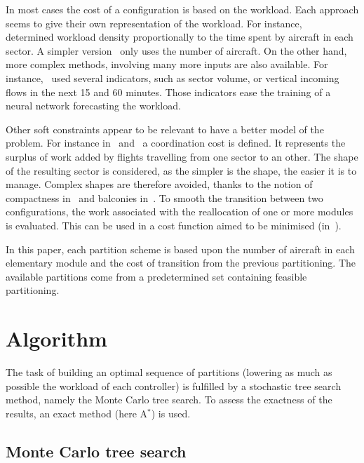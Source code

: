 \documentclass[oneside,twocolumn]{article}
\begin{document}
In most cases the cost of a configuration is based on the workload. Each
approach seems to give their own representation of the workload. For instance,
~\cite{bedouet2016towards} determined workload density proportionally to the time
spent by aircraft in each sector. A simpler version~\cite{sergeeva2017dynamic}
only uses the number of aircraft. On the other hand, more complex methods,
involving many more inputs are also available. For
instance,~\cite{gianazza2010forecasting} used several indicators, such as sector
volume, or vertical incoming flows in the next 15 and 60 minutes. Those
indicators ease the training of a neural network forecasting the workload.

Other soft constraints appear to be relevant to have a better model of
the problem. For instance in~\cite{sergeeva2017dynamic}
and~\cite{bedouet2016towards} a
coordination cost is defined. It represents the surplus of work added by
flights travelling from one sector to an other. The shape of the
resulting sector is considered, as the simpler is
the shape, the easier it is to manage. Complex shapes are therefore avoided,
thanks to the notion of compactness in~\cite{jagare2013airspace} and balconies
in~\cite{sergeeva2017dynamic}. To smooth the transition between two
configurations, the work associated with the reallocation of one or more modules
is evaluated. This can be used in a cost function aimed to be minimised
(in~\cite{bedouet2016towards}).

In this paper, each partition scheme is based upon the number of aircraft in
each
elementary module and the cost of transition from the previous partitioning. The
available partitions come from a predetermined set containing feasible
partitioning.

\section{Algorithm}

The task of building an optimal sequence of partitions (lowering
as much as possible the workload of each controller) is fulfilled by a
stochastic tree search method, namely the Monte Carlo tree search. To assess the
exactness of the results, an exact method (here A\(^*\)) is used.

\subsection{Monte Carlo tree search}
\end{document}
